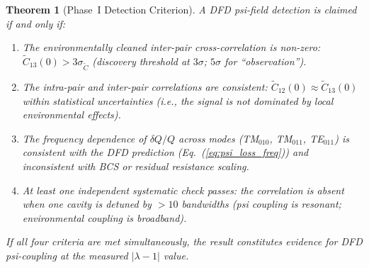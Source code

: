 \documentclass[11pt]{article}
\newcommand{\lam}{\lambda}
\newcommand{\lbone}{|\lam - 1|}
\newtheorem{theorem}{Theorem}[section]
\theoremstyle{definition}
\theoremstyle{remark}
\begin{document}
\begin{theorem}[Phase~I Detection Criterion]
\label{thm:detection_criterion}
A DFD psi-field detection is claimed if and only if:
\begin{enumerate}[nosep]
\item The environmentally cleaned inter-pair cross-correlation is
  non-zero:
  $\tilde{C}_{13}(0) > 3\sigma_{\tilde{C}}$ (discovery threshold at
  $3\sigma$; $5\sigma$ for ``observation'').
\item The intra-pair and inter-pair correlations are \emph{consistent}:
  $\tilde{C}_{12}(0) \approx \tilde{C}_{13}(0)$ within statistical
  uncertainties (i.e., the signal is not dominated by local
  environmental effects).
\item The frequency dependence of $\delta Q/Q$ across modes (TM$_{010}$,
  TM$_{011}$, TE$_{011}$) is consistent with the DFD prediction
  (Eq.~(\ref{eq:psi_loss_freq})) and \emph{inconsistent} with BCS or
  residual resistance scaling.
\item At least one independent systematic check passes: the correlation
  is absent when one cavity is detuned by $>10$ bandwidths (psi
  coupling is resonant; environmental coupling is broadband).
\end{enumerate}

If all four criteria are met simultaneously, the result constitutes
evidence for DFD psi-coupling at the measured $\lbone$ value.
\end{theorem}
\end{document}
